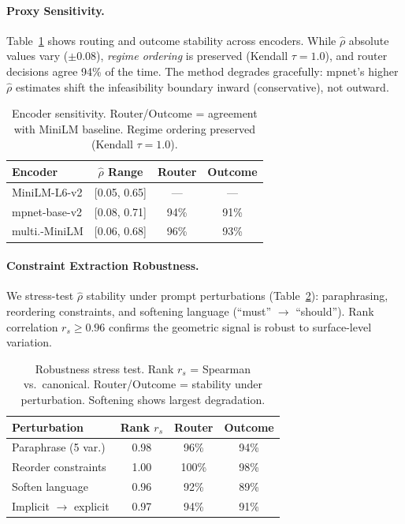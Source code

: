 \documentclass{article}
\theoremstyle{plain}
\theoremstyle{definition}
\theoremstyle{remark}
\newcommand{\rhohat}{\hat{\rho}}
\begin{document}
\paragraph{Proxy Sensitivity.}
Table~\ref{tab:encoder_sensitivity} shows routing and outcome stability across encoders. While $\rhohat$ absolute values vary ($\pm$0.08), \emph{regime ordering} is preserved (Kendall $\tau = 1.0$), and router decisions agree 94\% of the time. The method degrades gracefully: mpnet's higher $\rhohat$ estimates shift the infeasibility boundary inward (conservative), not outward.

\begin{table}[ht]
\centering
\footnotesize
\caption{Encoder sensitivity. Router/Outcome = agreement with MiniLM baseline. Regime ordering preserved (Kendall $\tau = 1.0$).}
\label{tab:encoder_sensitivity}
\begin{tabular}{lccc}
\toprule
Encoder & $\rhohat$ Range & Router & Outcome \\
\midrule
MiniLM-L6-v2 & [0.05, 0.65] & --- & --- \\
mpnet-base-v2 & [0.08, 0.71] & 94\% & 91\% \\
multi.-MiniLM & [0.06, 0.68] & 96\% & 93\% \\
\bottomrule
\end{tabular}
\end{table}

\paragraph{Constraint Extraction Robustness.}
We stress-test $\rhohat$ stability under prompt perturbations (Table~\ref{tab:robustness_stress}): paraphrasing, reordering constraints, and softening language (``must'' $\to$ ``should''). Rank correlation $r_s \geq 0.96$ confirms the geometric signal is robust to surface-level variation.

\begin{table}[ht]
\centering
\footnotesize
\caption{Robustness stress test. Rank $r_s$ = Spearman vs.\ canonical. Router/Outcome = stability under perturbation. Softening shows largest degradation.}
\label{tab:robustness_stress}
\begin{tabular}{lccc}
\toprule
Perturbation & Rank $r_s$ & Router & Outcome \\
\midrule
Paraphrase (5 var.) & 0.98 & 96\% & 94\% \\
Reorder constraints & 1.00 & 100\% & 98\% \\
Soften language & 0.96 & 92\% & 89\% \\
Implicit $\to$ explicit & 0.97 & 94\% & 91\% \\
\bottomrule
\end{tabular}
\end{table}
\end{document}
